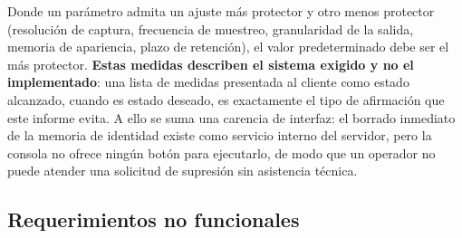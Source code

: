 Donde un parámetro admita un ajuste más protector y otro menos protector (resolución de
captura, frecuencia de muestreo, granularidad de la salida, memoria de apariencia, plazo de
retención), el valor predeterminado debe ser el más protector. \textbf{Estas medidas describen el
sistema exigido y no el implementado}: una lista de medidas presentada al cliente como estado
alcanzado, cuando es estado deseado, es exactamente el tipo de afirmación que este informe
evita. A ello se suma una carencia de interfaz: el borrado inmediato de la memoria de identidad
existe como servicio interno del servidor, pero la consola no ofrece ningún botón para
ejecutarlo, de modo que un operador no puede atender una solicitud de supresión sin
asistencia técnica.

\subsection{Requerimientos no funcionales}
\label{subsec:rnf}

